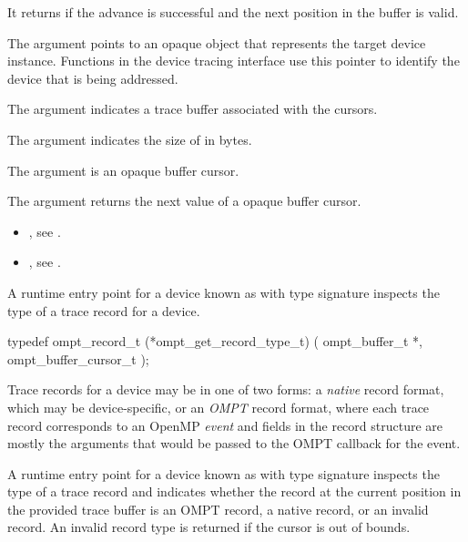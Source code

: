 \descr
It returns  if the advance is successful and the next
position in the buffer is valid.

\argdesc
The  argument points to an opaque object that represents
the target device instance. Functions in the device tracing interface
use this pointer to identify the device that is being addressed.

The argument  indicates a trace buffer associated
with the cursors.

The argument  indicates the size of  in
bytes.

The argument  is an opaque buffer cursor.

The argument  returns the next value of a opaque buffer cursor.


\crossreferences
\begin{itemize}
\item {},
see .
\item {},
see .
\end{itemize}

\label{sec:ompt_get_record_type_t}

\summary
A runtime entry point for a device known as
 with type signature
 inspects the type
of a trace record for a device.

\format
\begin{ccppspecific}
\begin{omptInquiry}
typedef ompt_record_t (*ompt_get_record_type_t) (
  ompt_buffer_t *,
  ompt_buffer_cursor_t 
);
\end{omptInquiry}
\end{ccppspecific}

\descr

Trace records for a device may be in one of two forms: a
\emph{native} record format, which may be device-specific,
or an \emph{OMPT} record format, where each trace record
corresponds to an OpenMP \emph{event} and fields in the record
structure are mostly the arguments that would be passed to the
OMPT callback for the event.

A runtime entry point for a device known as
 with type signature
 inspects the type
of a trace record and indicates whether the record at the current
position in the provided trace buffer is an OMPT record,
a native record, or an invalid record. An invalid record type
is returned if the cursor is out of bounds.

